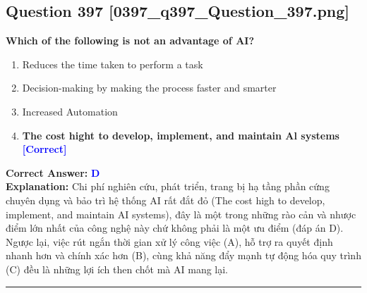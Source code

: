 \documentclass[11pt,a4paper]{article}
\begin{document}
\begin{minipage}{\textwidth}
\subsection*{Question 397 \quad \footnotesize{[0397\_q397\_Question\_397.png]}}
\noindent \textbf{Which of the following is not an advantage of AI?}

\begin{enumerate}[label=\Alph*.]
    \item Reduces the time taken to perform a task
    \item Decision-making by making the process faster and smarter
    \item Increased Automation
    \item \textbf{The cost hight to develop, implement, and maintain Al systems} \hfill \textcolor{blue}{\textbf{[Correct]}}
\end{enumerate}

\noindent \textbf{Correct Answer:} \textcolor{blue}{\textbf{D}} \\[2pt]
\noindent \textbf{Explanation:} Chi phí nghiên cứu, phát triển, trang bị hạ tầng phần cứng chuyên dụng và bảo trì hệ thống AI rất đắt đỏ (The cost high to develop, implement, and maintain AI systems), đây là một trong những rào cản và nhược điểm lớn nhất của công nghệ này chứ không phải là một ưu điểm (đáp án D). Ngược lại, việc rút ngắn thời gian xử lý công việc (A), hỗ trợ ra quyết định nhanh hơn và chính xác hơn (B), cùng khả năng đẩy mạnh tự động hóa quy trình (C) đều là những lợi ích then chốt mà AI mang lại.

\par\vspace{0.3cm}
\hrule
\vspace{0.3cm}
\end{minipage}
\end{document}
